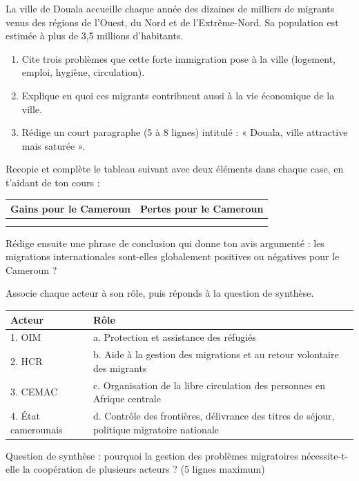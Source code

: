 \documentclass[11pt]{article}
\begin{document}
\begin{exercice}
La ville de Douala accueille chaque année des dizaines de milliers de migrants venus des régions de l'Ouest, du Nord et de l'Extrême-Nord. Sa population est estimée à plus de 3,5 millions d'habitants.
\begin{enumerate}
\item Cite trois problèmes que cette forte immigration pose à la ville (logement, emploi, hygiène, circulation).
\item Explique en quoi ces migrants contribuent aussi à la vie économique de la ville.
\item Rédige un court paragraphe (5 à 8 lignes) intitulé : « Douala, ville attractive mais saturée ».
\end{enumerate}
\end{exercice}

\begin{exercice}
Recopie et complète le tableau suivant avec deux éléments dans chaque case, en t'aidant de ton cours :
\begin{center}
\begin{tabularx}{\linewidth}{|X|X|}
\hline
\rowcolor{popblueL} \textbf{Gains pour le Cameroun} & \textbf{Pertes pour le Cameroun} \\
\hline
 & \\
\hline
 & \\
\hline
\end{tabularx}
\end{center}
Rédige ensuite une phrase de conclusion qui donne ton avis argumenté : les migrations internationales sont-elles globalement positives ou négatives pour le Cameroun ?
\end{exercice}

\begin{exercice}
Associe chaque acteur à son rôle, puis réponds à la question de synthèse.
\begin{center}
\begin{tabularx}{\linewidth}{|l|X|}
\hline
\rowcolor{popblueL} \textbf{Acteur} & \textbf{Rôle} \\
\hline
1. OIM & a. Protection et assistance des réfugiés \\
\hline
2. HCR & b. Aide à la gestion des migrations et au retour volontaire des migrants \\
\hline
3. CEMAC & c. Organisation de la libre circulation des personnes en Afrique centrale \\
\hline
4. État camerounais & d. Contrôle des frontières, délivrance des titres de séjour, politique migratoire nationale \\
\hline
\end{tabularx}
\end{center}
Question de synthèse : pourquoi la gestion des problèmes migratoires nécessite-t-elle la coopération de plusieurs acteurs ? (5 lignes maximum)
\end{exercice}
\end{document}
